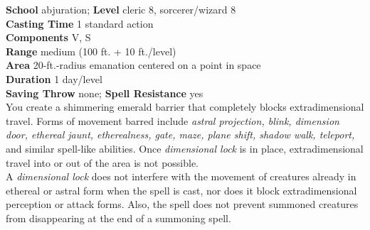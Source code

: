 \textbf{School} abjuration; \textbf{Level} cleric 8, sorcerer/wizard 8\\
\textbf{Casting Time} 1 standard action\\
\textbf{Components} V, S\\
\textbf{Range }medium (100 ft. + 10 ft./level)\\
\textbf{Area} 20-ft.-radius emanation centered on a point in space\\
\textbf{Duration} 1 day/level\\
\textbf{Saving Throw} none; \textbf{Spell Resistance} yes\\
You create a shimmering emerald barrier that completely blocks extradimensional travel. Forms of movement barred include \textit{astral projection, blink, dimension door, ethereal jaunt, etherealness, gate, maze, plane shift, shadow walk, teleport, }and similar spell-like abilities. Once \textit{dimensional lock }is in place, extradimensional travel into or out of the area is not possible.\\
A \textit{dimensional lock }does not interfere with the movement of creatures already in ethereal or astral form when the spell is cast, nor does it block extradimensional perception or attack forms. Also, the spell does not prevent summoned creatures from disappearing at the end of a summoning spell.\\

